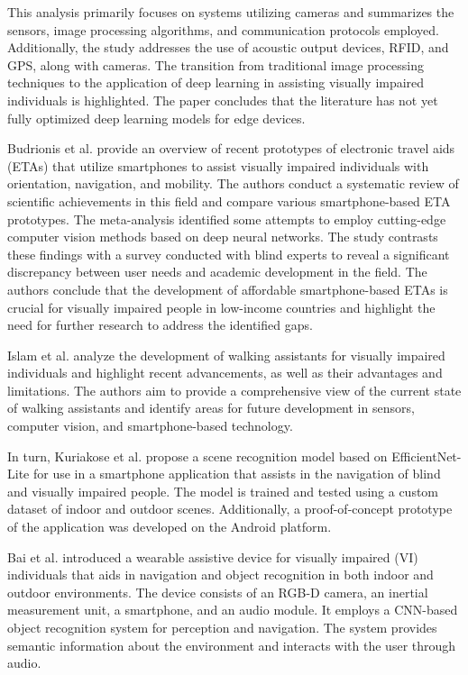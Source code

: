 \documentclass[preprint,12pt]{elsarticle}
\begin{document}
This analysis primarily focuses on systems utilizing cameras and summarizes the sensors, image processing algorithms, and communication protocols employed. Additionally, the study addresses the use of acoustic output devices, RFID, and GPS, along with cameras. The transition from traditional image processing techniques to the application of deep learning in assisting visually impaired individuals is highlighted. The paper concludes that the literature has not yet fully optimized deep learning models for edge devices.

Budrionis et al. \cite{budrionis2022} provide an overview of recent prototypes of electronic travel aids (ETAs) that utilize smartphones to assist visually impaired individuals with orientation, navigation, and mobility. The authors conduct a systematic review of scientific achievements in this field and compare various smartphone-based ETA prototypes. The meta-analysis identified some attempts to employ cutting-edge computer vision methods based on deep neural networks. The study contrasts these findings with a survey conducted with blind experts to reveal a significant discrepancy between user needs and academic development in the field. The authors conclude that the development of affordable smartphone-based ETAs is crucial for visually impaired people in low-income countries and highlight the need for further research to address the identified gaps.

Islam et al. \cite{islam2019} analyze the development of walking assistants for visually impaired individuals and highlight recent advancements, as well as their advantages and limitations. The authors aim to provide a comprehensive view of the current state of walking assistants and identify areas for future development in sensors, computer vision, and smartphone-based technology.

In turn, Kuriakose et al. \cite{kuriakose2021} propose a scene recognition model based on EfficientNet-Lite for use in a smartphone application that assists in the navigation of blind and visually impaired people. The model is trained and tested using a custom dataset of indoor and outdoor scenes. Additionally, a proof-of-concept prototype of the application was developed on the Android platform.

Bai et al. \cite{bai2019} introduced a wearable assistive device for visually impaired (VI) individuals that aids in navigation and object recognition in both indoor and outdoor environments. The device consists of an RGB-D camera, an inertial measurement unit, a smartphone, and an audio module. It employs a CNN-based object recognition system for perception and navigation. The system provides semantic information about the environment and interacts with the user through audio.
\end{document}
